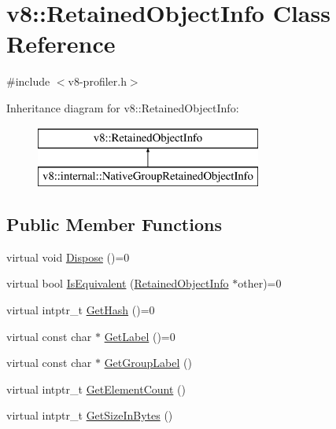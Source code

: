 \hypertarget{classv8_1_1_retained_object_info}{}\section{v8\+:\+:Retained\+Object\+Info Class Reference}
\label{classv8_1_1_retained_object_info}


{\ttfamily \#include $<$v8-\/profiler.\+h$>$}

Inheritance diagram for v8\+:\+:Retained\+Object\+Info\+:\begin{figure}[H]
\begin{center}
\leavevmode
\includegraphics[height=2.000000cm]{classv8_1_1_retained_object_info}
\end{center}
\end{figure}
\subsection*{Public Member Functions}
\begin{DoxyCompactItemize}
\item 
virtual void \hyperlink{classv8_1_1_retained_object_info_a5011203f7c5949049ba36b8059f03eca}{Dispose} ()=0
\item 
virtual bool \hyperlink{classv8_1_1_retained_object_info_a286103bb076c85415919c86b1838c990}{Is\+Equivalent} (\hyperlink{classv8_1_1_retained_object_info}{Retained\+Object\+Info} $\ast$other)=0
\item 
virtual intptr\+\_\+t \hyperlink{classv8_1_1_retained_object_info_a6fdbfa242b95615e63f08433419c8066}{Get\+Hash} ()=0
\item 
virtual const char $\ast$ \hyperlink{classv8_1_1_retained_object_info_ad19106fc7f0499fd45005077551d54c0}{Get\+Label} ()=0
\item 
virtual const char $\ast$ \hyperlink{classv8_1_1_retained_object_info_adf835370c5516f2a89dd2d3f83dee10b}{Get\+Group\+Label} ()
\item 
virtual intptr\+\_\+t \hyperlink{classv8_1_1_retained_object_info_ae6865597469bc7d28bd8ec71b4b890bd}{Get\+Element\+Count} ()
\item 
virtual intptr\+\_\+t \hyperlink{classv8_1_1_retained_object_info_a1a899eed0b1f6e046edc3c7a7c08aa8c}{Get\+Size\+In\+Bytes} ()
\end{DoxyCompactItemize}
